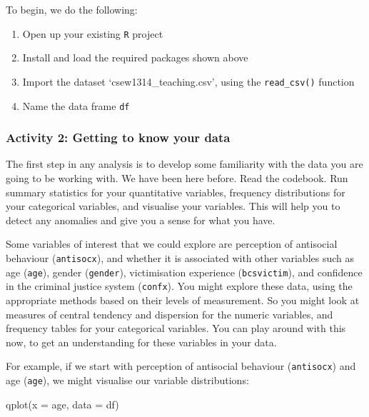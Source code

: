 \documentclass[
]{book}
\newenvironment{Shaded}{\begin{snugshade}}{\end{snugshade}}
\newcommand{\AttributeTok}[1]{\textcolor[rgb]{0.77,0.63,0.00}{#1}}
\newcommand{\FunctionTok}[1]{\textcolor[rgb]{0.00,0.00,0.00}{#1}}
\newcommand{\NormalTok}[1]{#1}
\begin{document}
To begin, we do the following:

\begin{enumerate}
\def\labelenumi{\arabic{enumi}.}
\item
  Open up your existing \texttt{R} project
\item
  Install and load the required packages shown above
\item
  Import the dataset `csew1314\_teaching.csv', using the \texttt{read\_csv()} function
\item
  Name the data frame \texttt{df}
\end{enumerate}

\hypertarget{activity-2-getting-to-know-your-data}{%
\subsubsection{Activity 2: Getting to know your data}\label{activity-2-getting-to-know-your-data}}

The first step in any analysis is to develop some familiarity with the data you are going to be working with. We have been here before. Read the codebook. Run summary statistics for your quantitative variables, frequency distributions for your categorical variables, and visualise your variables. This will help you to detect any anomalies and give you a sense for what you have.

Some variables of interest that we could explore are perception of antisocial behaviour (\texttt{antisocx}), and whether it is associated with other variables such as age (\texttt{age}), gender (\texttt{gender}), victimisation experience (\texttt{bcsvictim}), and confidence in the criminal justice system (\texttt{confx}). You might explore these data, using the appropriate methods based on their levels of measurement. So you might look at measures of central tendency and dispersion for the numeric variables, and frequency tables for your categorical variables. You can play around with this now, to get an understanding for these variables in your data.

For example, if we start with perception of antisocial behaviour (\texttt{antisocx}) and age (\texttt{age}), we might visualise our variable distributions:

\begin{Shaded}
\begin{Highlighting}[]
\FunctionTok{qplot}\NormalTok{(}\AttributeTok{x =}\NormalTok{ age, }\AttributeTok{data =}\NormalTok{ df)}
\end{Highlighting}
\end{Shaded}
\end{document}
